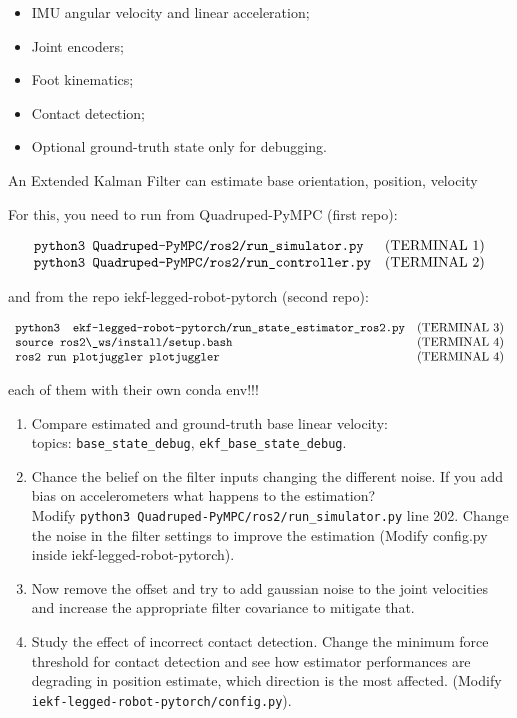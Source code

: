 \documentclass[11pt,a4paper]{article}
\begin{document}
\begin{itemize}
    \item IMU angular velocity and linear acceleration;
    \item Joint encoders;
    \item Foot kinematics;
    \item Contact detection;
    \item Optional ground-truth state only for debugging.
\end{itemize}

An Extended Kalman Filter can estimate base orientation, position, velocity

For this, you need to run from Quadruped-PyMPC (first repo):

\[
\begin{array}{ll}
\verb|python3 Quadruped-PyMPC/ros2/run_simulator.py| & \text{(TERMINAL 1)} \\
\verb|python3 Quadruped-PyMPC/ros2/run_controller.py|  & \text{(TERMINAL 2)}
\end{array}
\]



and from the repo iekf-legged-robot-pytorch (second repo):

\[
\begin{array}{ll}
	\verb|python3  ekf-legged-robot-pytorch/run_state_estimator_ros2.py| & \text{(TERMINAL 3)} \\
    \verb|source ros2\_ws/install/setup.bash|   & \text{(TERMINAL 4)} \\
    \verb|ros2 run plotjuggler plotjuggler| & \text{(TERMINAL 4)}
\end{array}
\]

each of them with their own conda env!!!




\begin{enumerate}[label=\arabic*.]
    \item Compare estimated and ground-truth base linear velocity: \\ topics: \verb|base_state_debug|, \verb|ekf_base_state_debug|.
    \item Chance the belief on the filter inputs changing the different noise. If you add bias on accelerometers what happens to the estimation? \\Modify \verb|python3 Quadruped-PyMPC/ros2/run_simulator.py|  line 202.
    Change the noise in the filter settings to improve the estimation (Modify config.py inside iekf-legged-robot-pytorch). 
    \item Now remove the offset and try to add gaussian noise to the joint velocities and increase the appropriate filter covariance to mitigate that. 
    \item   Study the effect of incorrect contact detection. Change the minimum force threshold for contact detection and see how estimator performances are degrading in position estimate, which direction is the most affected. (Modify \verb|iekf-legged-robot-pytorch/config.py|). 
\end{enumerate}
\end{document}
